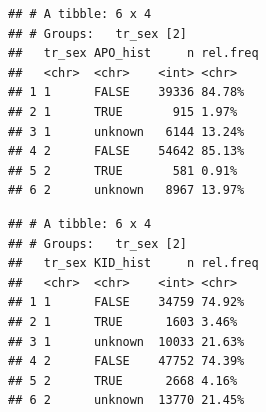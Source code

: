 \documentclass[]{article}
\newenvironment{Shaded}{\begin{snugshade}}{\end{snugshade}}
\newcommand{\DataTypeTok}[1]{\textcolor[rgb]{0.13,0.29,0.53}{#1}}
\newcommand{\DecValTok}[1]{\textcolor[rgb]{0.00,0.00,0.81}{#1}}
\newcommand{\KeywordTok}[1]{\textcolor[rgb]{0.13,0.29,0.53}{\textbf{#1}}}
\newcommand{\NormalTok}[1]{#1}
\newcommand{\OperatorTok}[1]{\textcolor[rgb]{0.81,0.36,0.00}{\textbf{#1}}}
\newcommand{\OtherTok}[1]{\textcolor[rgb]{0.56,0.35,0.01}{#1}}
\newcommand{\StringTok}[1]{\textcolor[rgb]{0.31,0.60,0.02}{#1}}
\begin{document}
\begin{verbatim}
## # A tibble: 6 x 4
## # Groups:   tr_sex [2]
##   tr_sex APO_hist     n rel.freq
##   <chr>  <chr>    <int> <chr>   
## 1 1      FALSE    39336 84.78%  
## 2 1      TRUE       915 1.97%   
## 3 1      unknown   6144 13.24%  
## 4 2      FALSE    54642 85.13%  
## 5 2      TRUE       581 0.91%   
## 6 2      unknown   8967 13.97%
\end{verbatim}

\begin{Shaded}
\end{Shaded}

\begin{verbatim}
## # A tibble: 6 x 4
## # Groups:   tr_sex [2]
##   tr_sex KID_hist     n rel.freq
##   <chr>  <chr>    <int> <chr>   
## 1 1      FALSE    34759 74.92%  
## 2 1      TRUE      1603 3.46%   
## 3 1      unknown  10033 21.63%  
## 4 2      FALSE    47752 74.39%  
## 5 2      TRUE      2668 4.16%   
## 6 2      unknown  13770 21.45%
\end{verbatim}

\begin{Shaded}
\end{Shaded}
\end{document}
